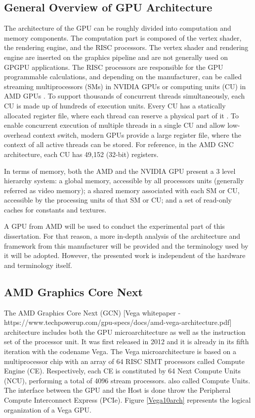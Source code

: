 \subsection{General Overview of GPU Architecture}
The architecture of the GPU can be roughly divided into computation and memory components. The computation part is composed of the vertex shader, the rendering engine, and the RISC processors. The vertex shader and rendering engine are inserted on the graphics pipeline and are not generally used on GPGPU applications. The RISC processors are responsible for the GPU programmable calculations, and depending on the manufacturer, can be called streaming multiprocessors (SMs) in NVIDIA GPUs \cite{nvidia_cuda_nodate} or computing units (CU) in AMD GPUs \cite{amd_amd_nodate}. To support thousands of concurrent threads simultaneously, each CU is made up of hundreds of execution units. Every CU has a statically allocated register file, where each thread can reserve a physical part of it \cite{jing_energy-efficient_2013}. To enable concurrent execution of multiple threads in a single CU and allow low-overhead context switch, modern GPUs provide a large register file, where the context of all active threads can be stored. For reference, in the AMD GNC architecture, each CU has ‭49,152‬ (32-bit) registers.

In terms of memory, both the AMD and the NVIDIA GPU present a 3 level hierarchy system: a global memory, accessible by all processors units (generally referred as video memory); a shared memory associated with each SM or CU, accessible by the processing units of that SM or CU; and a set of read-only caches for constants and textures.

A GPU from AMD will be used to conduct the experimental part of this dissertation. For that reason, a more in-depth analysis of the architecture and framework from this manufacturer will be provided and the terminology used by it will be adopted. However, the presented work is independent of the hardware and terminology itself.

\subsection{AMD Graphics Core Next}

The AMD Graphics Core Next (GCN) [Vega whitepaper - https://www.techpowerup.com/gpu-specs/docs/amd-vega-architecture.pdf] architecture includes both the GPU microarchitecture as well as the instruction set of the processor unit. It was first released in 2012 and it is already in its fifth iteration with the codename Vega. The Vega microarchitecture is based on a multiprocessor chip with an array of 64 RISC SIMT processors called Compute Engine (CE). Respectively, each CE is constituted by 64 Next Compute Units (NCU), performing a total of 4096 stream processors. also called Compute Units. The interface between the GPU and the Host is done throw the Peripheral Compute Interconnect Express (PCIe). Figure \ref{Vega10arch} represents the logical organization of a Vega GPU. 

